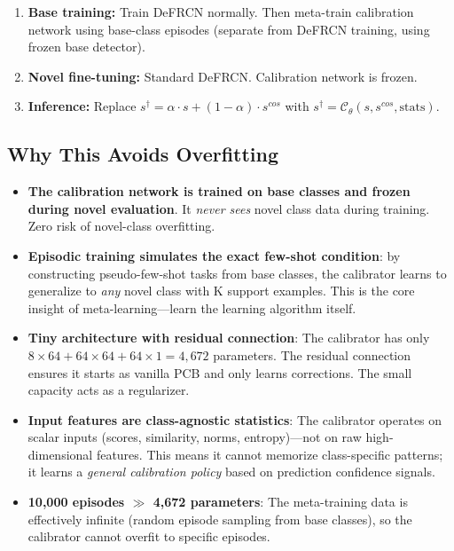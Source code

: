 \documentclass[11pt,a4paper]{article}
\begin{document}
\begin{enumerate}[nosep]
    \item \textbf{Base training:} Train DeFRCN normally. Then meta-train calibration network using base-class episodes (separate from DeFRCN training, using frozen base detector).
    \item \textbf{Novel fine-tuning:} Standard DeFRCN. Calibration network is frozen.
    \item \textbf{Inference:} Replace $s^\dagger = \alpha \cdot s + (1-\alpha) \cdot s^{cos}$ with $s^\dagger = \mathcal{C}_\theta(s, s^{cos}, \text{stats})$.
\end{enumerate}

\subsection{Why This Avoids Overfitting}

\begin{itemize}[nosep]
    \item \textbf{The calibration network is trained on base classes and frozen during novel evaluation}. It \textit{never sees} novel class data during training. Zero risk of novel-class overfitting.
    \item \textbf{Episodic training simulates the exact few-shot condition}: by constructing pseudo-few-shot tasks from base classes, the calibrator learns to generalize to \textit{any} novel class with K support examples. This is the core insight of meta-learning---learn the learning algorithm itself.
    \item \textbf{Tiny architecture with residual connection}: The calibrator has only $8 \times 64 + 64 \times 64 + 64 \times 1 = 4,672$ parameters. The residual connection ensures it starts as vanilla PCB and only learns corrections. The small capacity acts as a regularizer.
    \item \textbf{Input features are class-agnostic statistics}: The calibrator operates on scalar inputs (scores, similarity, norms, entropy)---not on raw high-dimensional features. This means it cannot memorize class-specific patterns; it learns a \textit{general calibration policy} based on prediction confidence signals.
    \item \textbf{10,000 episodes $\gg$ 4,672 parameters}: The meta-training data is effectively infinite (random episode sampling from base classes), so the calibrator cannot overfit to specific episodes.
\end{itemize}
\end{document}
